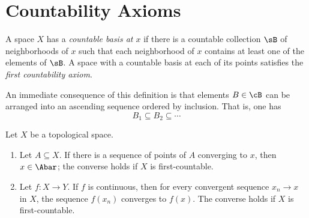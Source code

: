 \documentclass{amsart}
\title{}
\author{Frank Tsai}
\date{\today}
\begin{document}
\maketitle
\tableofcontents

\section{Countability Axioms}
\label{sec:countability-axioms}

\begin{defn}
  A space $X$ has a \emph{countable basis at $x$} if there is a countable collection $\sB$ of neighborhoods of $x$ such that each neighborhood of $x$ contains at least one of the elements of $\sB$.
  A space with a countable basis at each of its points satisfies the \emph{first countability axiom}.
\end{defn}

An immediate consequence of this definition is that elements $B \in \cB$ can be arranged into an ascending sequence ordered by inclusion.
That is, one has
\[
  B_{1} \subseteq B_{2} \subseteq \cdots
\]

\begin{thm}
  Let $X$ be a topological space.
  \begin{enumerate}
  \item Let $A \subseteq X$.
    If there is a sequence of points of $A$ converging to $x$, then $x \in \Abar$; the converse holds if $X$ is first-countable.
  \item Let $f : X \to Y$.
    If $f$ is continuous, then for every convergent sequence $x_{n} \to x$ in $X$, the sequence $f(x_{n})$ converges to $f(x)$.
    The converse holds if $X$ is first-countable.
  \end{enumerate}
\end{thm}
\end{document}
